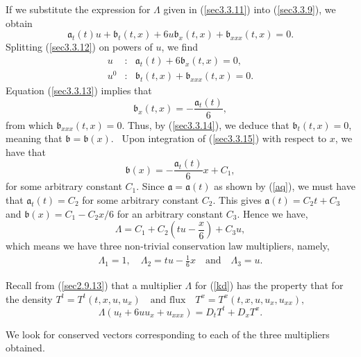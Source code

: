	 If we substitute  the expression for $\Lambda$ given in   (\ref{sec3.3.11}) into  (\ref{sec3.3.9}), we obtain \begin{equation} \mathfrak{a}_t(t) u + \mathfrak{b}_t(t,x) + 6 u\mathfrak{b}_x(t,x)+ \mathfrak{b}_{xxx}(t,x) =0. \label{sec3.3.12}
\end{equation} 
 Splitting  (\ref{sec3.3.12}) on powers of $u$, we find	
\begin{eqnarray}
\label{sec3.3.13}u &:& \mathfrak{a}_t(t)+ 6 \mathfrak{b}_x(t,x)=0, \\
\label{sec3.3.14}u^0 &:&  \mathfrak{b}_t(t,x)+ \mathfrak{b}_{xxx}(t,x) =0.
\end{eqnarray}	
Equation (\ref{sec3.3.13})  implies that 	\begin{equation}
\mathfrak{b}_x(t,x)= -\frac{ \mathfrak{a}_t(t) }{6} , \label{sec3.3.15}
\end{equation} from which $ \mathfrak{b}_{xxx}(t,x)=0.$ Thus, by  (\ref{sec3.3.14}), we deduce that $ \mathfrak{b}_t(t,x)=0$, meaning  that 
$\mathfrak{b}=\mathfrak{b}(x).$
\ Upon integration of (\ref{sec3.3.15}) with respect to $x$, we have that 
\begin{equation}
	\mathfrak{b}(x)=-\frac{ \mathfrak{a}_t(t) }{6} x+ C_1,   \label{sec3.3.17}
\end{equation} for some arbitrary constant $C_1$. Since
  $\mathfrak{a}=\mathfrak{a}(t)$ as shown by  (\ref{aq}), we must have that  $\mathfrak{a}_t(t)=C_2 $ for some arbitrary constant $C_2$.
 This gives $ \mathfrak{a}(t)=C_2 t + C_3$ and $	\mathfrak{b}(x)= C_1-C_2x/6  $  for an  arbitrary constant $C_3$.
Hence  we have, \begin{equation} \Lambda = C_1 +C_2\left( tu-\frac{x }{6} \right) + C_3 u,
\end{equation} which means we have  three non-trivial conservation law multipliers, namely,\begin{align}
 \Lambda_1 = 1, \quad 
\Lambda_2= tu-\frac{1 }{6}x \quad \text{and} \quad \Lambda_3 = u.	
\end{align} 
\begin{rem} Recall from (\ref{sec2.9.13}) that
a multiplier  $\Lambda $ for  (\ref{kd}) has the property that   for  the density $ T^t = T^t(t,x,u,u_x) \quad \text{and flux}  \quad  T^x = T^x(t,x,u,u_x,u_{xx}),$  \begin{equation} \Lambda \left( u_t + 6uu_x + u_{xxx}\right) = D_t T^t + D_x T^x \label{sec3.3.20}.
\end{equation} 
\end{rem} We look for  conserved vectors corresponding to each of the three multipliers obtained.

